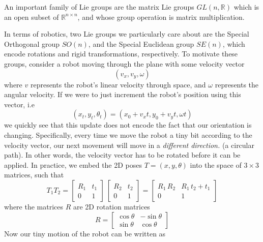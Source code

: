 \documentclass[reqno]{amsart}
\theoremstyle{definition}
\numberwithin{equation}{section}
\begin{document}
An important family of Lie groups are the matrix Lie groups $GL(n, \mathbb{R})$ which is an open subset of $\mathbb{R}^{n \times n}$, and whose group operation is matrix multiplication.

In terms of robotics, two Lie groups we particularly care about are the Special Orthogonal group $SO(n)$, and the Special Euclidean group $SE(n)$, which encode rotations and rigid transformations, respectively. To motivate these groups, consider a robot moving through the plane with some velocity vector
\begin{equation*}
    (v_x, v_y, \omega)
\end{equation*}
where $v$ represents the robot's linear velocity through space, and $\omega$ represents the angular velocity. If we were to just increment the robot's position using this vector, i.e
\begin{equation*}
    (x_t, y_t, \theta_t) = (x_0 + v_x t, y_0 + v_y t, \omega t)
\end{equation*}
 we quickly see that this update does not encode the fact that our orientation is changing. Specifically, every time we move the robot a tiny bit according to the velocity vector, our next movement will move in a \textit{different direction.} (a circular path). In other words, the velocity vector has to be rotated before it can be applied. In practice, we embed the 2D poses $T = (x, y, \theta)$ into the space of $3 \times 3$ matrices, such that
 \begin{equation*}
    T_1T_2 = \begin{bmatrix}
        R_1 & t_1 \\
        0 & 1
    \end{bmatrix}\,\begin{bmatrix}
        R_2 & t_2 \\
        0 & 1
    \end{bmatrix} = \begin{bmatrix}
        R_1\,R_2 & R_1\,t_2 + t_1 \\
        0 & 1
    \end{bmatrix}
 \end{equation*}
 where the matrices $R$ are 2D rotation matrices
 \begin{equation*}
    R = \begin{bmatrix}
        \cos\theta &  -\sin\theta \\
        \sin\theta & \cos\theta
    \end{bmatrix}
 \end{equation*}
 Now our tiny motion of the robot can be written as
\end{document}
